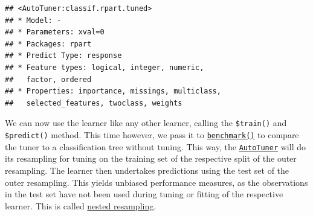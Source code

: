 \documentclass[]{article}
\newenvironment{Shaded}{\begin{snugshade}}{\end{snugshade}}
\newcommand{\DataTypeTok}[1]{\textcolor[rgb]{0.13,0.29,0.53}{#1}}
\newcommand{\DecValTok}[1]{\textcolor[rgb]{0.00,0.00,0.81}{#1}}
\newcommand{\FloatTok}[1]{\textcolor[rgb]{0.00,0.00,0.81}{#1}}
\newcommand{\KeywordTok}[1]{\textcolor[rgb]{0.13,0.29,0.53}{\textbf{#1}}}
\newcommand{\NormalTok}[1]{#1}
\newcommand{\OperatorTok}[1]{\textcolor[rgb]{0.81,0.36,0.00}{\textbf{#1}}}
\newcommand{\StringTok}[1]{\textcolor[rgb]{0.31,0.60,0.02}{#1}}
\renewenvironment{Shaded} {\begin{snugshade}\small} {\end{snugshade}}
\begin{document}
\begin{Shaded}
\end{Shaded}

\begin{verbatim}
## <AutoTuner:classif.rpart.tuned>
## * Model: -
## * Parameters: xval=0
## * Packages: rpart
## * Predict Type: response
## * Feature types: logical, integer, numeric,
##   factor, ordered
## * Properties: importance, missings, multiclass,
##   selected_features, twoclass, weights
\end{verbatim}

We can now use the learner like any other learner, calling the \texttt{\$train()} and \texttt{\$predict()} method.
This time however, we pass it to \href{https://mlr3.mlr-org.com/reference/benchmark.html}{\texttt{benchmark()}} to compare the tuner to a classification tree without tuning.
This way, the \href{https://mlr3tuning.mlr-org.com/reference/AutoTuner.html}{\texttt{AutoTuner}} will do its resampling for tuning on the training set of the respective split of the outer resampling.
The learner then undertakes predictions using the test set of the outer resampling.
This yields unbiased performance measures, as the observations in the test set have not been used during tuning or fitting of the respective learner.
This is called \protect\hyperlink{nested-resampling}{nested resampling}.
\end{document}
